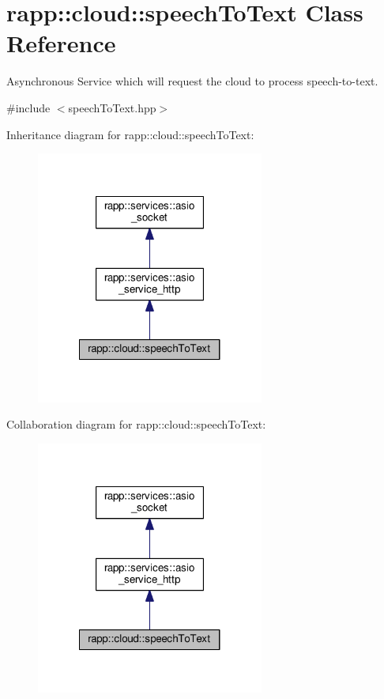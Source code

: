 \hypertarget{classrapp_1_1cloud_1_1speechToText}{\section{rapp\-:\-:cloud\-:\-:speech\-To\-Text Class Reference}
\label{classrapp_1_1cloud_1_1speechToText}
}


Asynchronous Service which will request the cloud to process speech-\/to-\/text.  




{\ttfamily \#include $<$speech\-To\-Text.\-hpp$>$}



Inheritance diagram for rapp\-:\-:cloud\-:\-:speech\-To\-Text\-:
\nopagebreak
\begin{figure}[H]
\begin{center}
\leavevmode
\includegraphics[width=212pt]{classrapp_1_1cloud_1_1speechToText__inherit__graph}
\end{center}
\end{figure}


Collaboration diagram for rapp\-:\-:cloud\-:\-:speech\-To\-Text\-:
\nopagebreak
\begin{figure}[H]
\begin{center}
\leavevmode
\includegraphics[width=212pt]{classrapp_1_1cloud_1_1speechToText__coll__graph}
\end{center}
\end{figure}
